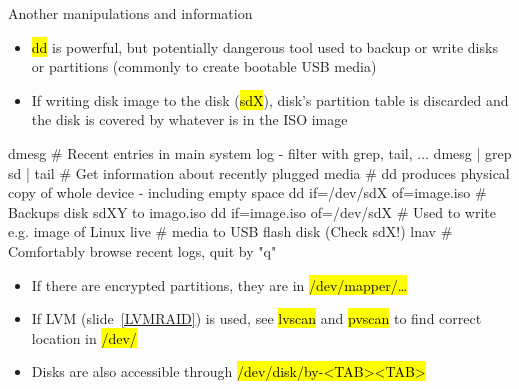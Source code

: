 \documentclass[compress, ucs, xelatex, 11pt, xcolor=svgnames, aspectratio=169,
	hyperref={
		bookmarks=true,
		unicode=true,
		colorlinks=true,
		pdftitle={Linux, command line and MetaCentrum},
		plainpages=false,
		pdfauthor={Vojtech Zeisek},
		pdfsubject={Course about use of Linux command line, writing shell scripts and using MetaCentrum of CESNET},
		pdfcreator={XeLaTeX},
		pdfkeywords={Linux, GNU, BASH, shell, command line, MetaCentrum},
		linkcolor=DarkRed, %
		anchorcolor=DarkBlue, %
		citecolor=Indigo, %
		filecolor=NavyBlue, %
		menucolor=DarkMagenta, %
		urlcolor=DarkBlue, %
		pdftex},
	url={hyphens, lowtilde} %
	]{beamer}
\renewcommand{\texttt}[1]{\hl{\ttfamily #1}}
\begin{document}
\begin{frame}[fragile]{Another manipulations and information}
	\begin{itemize}
		\item \texttt{dd} is powerful, but potentially dangerous tool used to backup or write disks or partitions (commonly to create bootable USB media)
		\item If writing disk image to the disk (\texttt{sdX}), disk's partition table is discarded and the disk is covered by whatever is in the ISO image
	\end{itemize}
	\begin{bashcode}
    dmesg # Recent entries in main system log - filter with grep, tail, ...
    dmesg | grep sd | tail # Get information about recently plugged media
    # dd produces physical copy of whole device - including empty space
    dd if=/dev/sdX of=image.iso # Backups disk sdXY to imago.iso
    dd if=image.iso of=/dev/sdX # Used to write e.g. image of Linux live
                                # media to USB flash disk (Check sdX!)
    lnav # Comfortably browse recent logs, quit by "q"
	\end{bashcode}
	\begin{itemize}
		\item If there are encrypted partitions, they are in \texttt{/dev/mapper/\ldots}
		\item If LVM (slide~\ref{LVMRAID}) is used, see \texttt{lvscan} and \texttt{pvscan} to find correct location in \texttt{/dev/}
		\item Disks are also accessible through \texttt{/dev/disk/by-<TAB><TAB>}
	\end{itemize}
\end{frame}
\end{document}
